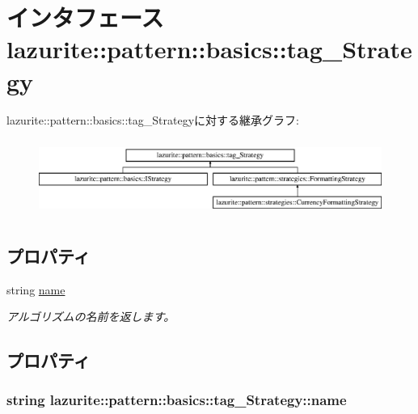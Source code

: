 \hypertarget{interfacelazurite_1_1pattern_1_1basics_1_1tag___strategy}{
\section{インタフェース lazurite::pattern::basics::tag\_\-Strategy}
\label{interfacelazurite_1_1pattern_1_1basics_1_1tag___strategy}
}
lazurite::pattern::basics::tag\_\-Strategyに対する継承グラフ:\begin{figure}[H]
\begin{center}
\leavevmode
\includegraphics[height=2.53012cm]{interfacelazurite_1_1pattern_1_1basics_1_1tag___strategy}
\end{center}
\end{figure}
\subsection*{プロパティ}
\begin{DoxyCompactItemize}
\item 
string \hyperlink{interfacelazurite_1_1pattern_1_1basics_1_1tag___strategy_a0c5fea8c84f0ff805895bacd78d1f256}{name}
\begin{DoxyCompactList}\small\item\em アルゴリズムの名前を返します。 \item\end{DoxyCompactList}\end{DoxyCompactItemize}


\subsection{プロパティ}
\hypertarget{interfacelazurite_1_1pattern_1_1basics_1_1tag___strategy_a0c5fea8c84f0ff805895bacd78d1f256}{
\subsubsection[{name}]{\setlength{\rightskip}{0pt plus 5cm}string lazurite::pattern::basics::tag\_\-Strategy::name}}
\label{interfacelazurite_1_1pattern_1_1basics_1_1tag___strategy_a0c5fea8c84f0ff805895bacd78d1f256}


